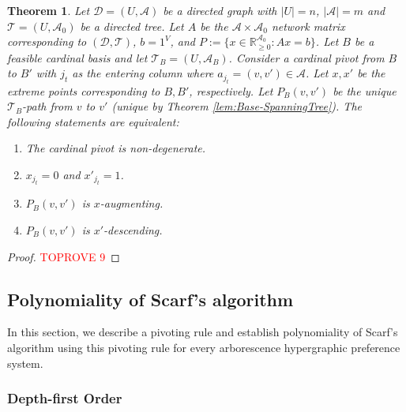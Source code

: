 \documentclass[11pt]{article}
\newcommand{\R}{\mathbb{R}}
\newtheorem{theorem}{Theorem}
\begin{document}
\begin{theorem}\label{lem:Nonde-Pivot}
Let $\mathcal{D}=(U,\mathcal{A})$ be a directed graph with $|U|=n$, $|\mathcal{A}|=m$ and $\mathcal{T}=(U,\mathcal{A}_0)$ be a directed tree. Let $A$ be the $\mathcal{A}\times \mathcal{A}_0$ network matrix corresponding to $(\mathcal{D},\mathcal{T})$, $b=1^V$, and $P:=\{x\in \R^{\mathcal{A}_0}_{\ge 0}: Ax=b \}$. 
Let $B$ be a feasible cardinal basis and let $\mathcal{T}_B=(U,\mathcal{A}_B)$. 
Consider a cardinal pivot from $B$ to $B'$ with $j_t$ as the entering column where $a_{j_t}=(v,v')\in\mathcal{A}$. Let $x,x'$ be the extreme points corresponding to $B,B'$, respectively. Let $P_B(v,v')$ be the unique $\mathcal{T}_B$-path from $v$ to $v'$ (unique by Theorem \ref{lem:Base-SpanningTree}). The following statements are equivalent:

    \begin{enumerate}
        \item[(i)] The cardinal pivot is non-degenerate.
        \item[(ii)] $x_{j_t}=0$ and $x'_{j_t}=1$.
        \item[(iii)] $P_B(v,v')$ is $x$-augmenting.
        
\item[(iv)] $P_B(v,v')$ is $x'$-descending.
    \end{enumerate}

\end{theorem}
\begin{proof}\textcolor{red}{TOPROVE 9}\end{proof}









\subsection{Polynomiality of Scarf's algorithm}
In this section, we describe a pivoting rule and establish polynomiality of Scarf's algorithm using this pivoting rule for every arborescence hypergraphic preference system. 
\subsubsection{Depth-first Order}\label{sec:DFO}
\end{document}
